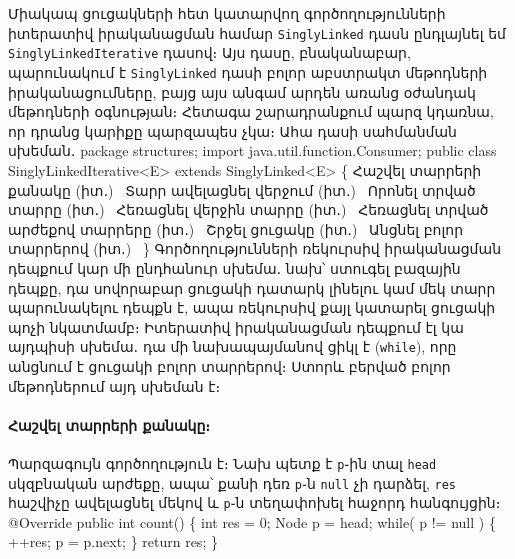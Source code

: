 Միակապ ցուցակների հետ կատարվող գործողությունների իտերատիվ 
իրականացման համար \texttt{SinglyLinked} դասն ընդլայնել եմ 
\texttt{SinglyLinkedIterative} դասով։ Այս դասը, բնականաբար,
պարունակում է \texttt{SinglyLinked} դասի բոլոր աբստրակտ 
մեթոդների իրականացումները, բայց այս անգամ արդեն առանց 
օժանդակ մեթոդների օգնության։ Հետագա շարադրանքում պարզ 
կդառնա, որ դրանց կարիքը պարզապես չկա։ Ահա դասի սահմանման
սխեման․ 
\nwenddocs{}\endmoddef{}
package structures;
import java.util.function.Consumer;
public class SinglyLinkedIterative<E> extends SinglyLinked<E> \{
  \LA{}Հաշվել տարրերի քանակը (իտ․)~{\nwtagstyle{}}\RA{}
  \LA{}Տարր ավելացնել վերջում (իտ․)~{\nwtagstyle{}}\RA{}
  \LA{}Որոնել տրված տարրը (իտ․)~{\nwtagstyle{}}\RA{}
  \LA{}Հեռացնել վերջին տարրը (իտ․)~{\nwtagstyle{}}\RA{}
  \LA{}Հեռացնել տրված արժեքով տարրերը (իտ․)~{\nwtagstyle{}}\RA{}
  \LA{}Շրջել ցուցակը (իտ․)~{\nwtagstyle{}}\RA{}
  \LA{}Անցնել բոլոր տարրերով (իտ․)~{\nwtagstyle{}}\RA{}
\}
\nwendcode{}\nwdocspar
Գործողությունների ռեկուրսիվ իրականացման դեպքում կար մի 
ընդհանուր սխեմա․ նախ՝ ստուգել բազային դեպքը, դա սովորաբար
ցուցակի դատարկ լինելու կամ մեկ տարր պարունակելու դեպքն է, 
ապա ռեկուրսիվ քայլ կատարել ցուցակի պոչի նկատմամբ։ 
Իտերատիվ իրականացման դեպքում էլ կա այդպիսի սխեմա․ դա 
մի նախապայմանով ցիկլ է (\texttt{while}), որը անցնում է
ցուցակի բոլոր տարրերով։ Ստորև բերված բոլոր մեթոդներում
այդ սխեման է։

%
%
\paragraph{Հաշվել տարրերի քանակը։}
Պարզագույն գործողություն է։ Նախ պետք է \texttt{p}֊ին տալ 
\texttt{head} սկզբնական արժեքը, ապա՝ քանի դեռ \texttt{p}֊ն
\texttt{null} չի դարձել, \texttt{res} հաշվիչը ավելացնել մեկով
և \texttt{p}֊ն տեղափոխել հաջորդ հանգույցին։ 
\nwenddocs{}\endmoddef{}
@Override
public int count()
\{
  int res = 0;
  Node p = head;
  while( p != null ) \{
    ++res;
    p = p.next;
  \}
  return res;
\}
\nwendcode{}\nwdocspar


